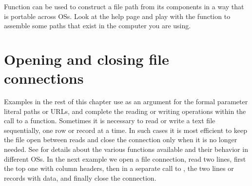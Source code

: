 \documentclass[krantz2]{krantz}\usepackage{knitr}
\begin{document}
\begin{playground}
Function  can be used to construct a file path from its components in a way that is portable across OSs. Look at the help page and play with the function to assemble some paths that exist in the computer you are using.
\end{playground}

\section{Opening and closing file connections}\label{sec:io:connections}

Examples in the rest of this chapter use as an argument for the  formal parameter literal paths or URLs, and complete the reading or writing operations within the call to a function. Sometimes it is necessary to read or write a text file sequentially, one row or record at a time. In such cases it is most efficient to keep the file open between reads and close the connection only when it is no longer needed. See  for details about the various functions available and their behavior in different OSs. In the next example we open a file connection, read two lines, first the top one with column headers, then in a separate call to , the two lines or records with data, and finally close the connection.

\begin{knitrout}\footnotesize
{}\color{fgcolor}\begin{kframe}
\begin{alltt}
 \hlkwb{<-} \hlstd{(}\hlstd{,}  \hlstd{=} \hlstd{)} 
\end{alltt}


{\ttfamily\noindent{}}

{\ttfamily\noindent\bfseries{}}\begin{alltt}
  \hlstd{=} \hlstd{)}
\end{alltt}


{\ttfamily\noindent\bfseries\color{errorcolor}{\#\# Error in readLines(f1, n = 1L): object 'f1' not found}}\end{kframe}
\end{knitrout}
\end{document}
